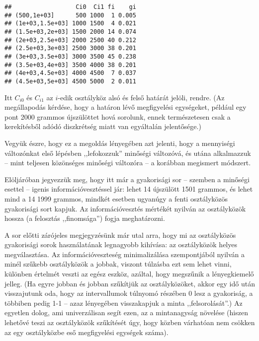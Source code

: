 \documentclass[]{book}
\newenvironment{Shaded}{\begin{snugshade}}{\end{snugshade}}
\newcommand{\DataTypeTok}[1]{\textcolor[rgb]{0.13,0.29,0.53}{#1}}
\newcommand{\DecValTok}[1]{\textcolor[rgb]{0.00,0.00,0.81}{#1}}
\newcommand{\KeywordTok}[1]{\textcolor[rgb]{0.13,0.29,0.53}{\textbf{#1}}}
\newcommand{\NormalTok}[1]{#1}
\newcommand{\OperatorTok}[1]{\textcolor[rgb]{0.81,0.36,0.00}{\textbf{#1}}}
\newcommand{\StringTok}[1]{\textcolor[rgb]{0.31,0.60,0.02}{#1}}
\begin{document}
\begin{Shaded}
\end{Shaded}

\begin{verbatim}
##                  Ci0  Ci1 fi    gi
## (500,1e+03]      500 1000  1 0.005
## (1e+03,1.5e+03] 1000 1500  4 0.021
## (1.5e+03,2e+03] 1500 2000 14 0.074
## (2e+03,2.5e+03] 2000 2500 40 0.212
## (2.5e+03,3e+03] 2500 3000 38 0.201
## (3e+03,3.5e+03] 3000 3500 45 0.238
## (3.5e+03,4e+03] 3500 4000 38 0.201
## (4e+03,4.5e+03] 4000 4500  7 0.037
## (4.5e+03,5e+03] 4500 5000  2 0.011
\end{verbatim}

Itt \(C_{i0}\) és \(C_{i1}\) az \(i\)-edik osztályköz alsó és felső határát jelöli, rendre. (Az megállapodás kérdése, hogy a határon lévő megfigyelési egységeket, például egy pont 2000 grammos újszülöttet hová sorolunk, ennek természetesen csak a kerekítésből adódó diszkrétség miatt van egyáltalán jelentősége.)

Vegyük észre, hogy ez a megoldás lényegében azt jelenti, hogy a mennyiségi változónkat első lépésben ,,lefokozzuk'' minőségi változóvá, és utána alkalmazzuk -- mint teljesen közönséges minőségi változóra -- a korábban megismert módszert.

Elöljáróban jegyezzük meg, hogy itt már a gyakorisági sor -- szemben a minőségi esettel -- igenis információvesztéssel jár: lehet 14 újszülött 1501 grammos, és lehet mind a 14 1999 grammos, mindkét esetben ugyanúgy a fenti osztályközös gyakorisági sort kapjuk. Az információvesztés mértékét nyilván az osztályközök hossza (a felosztás ,,finomsága'') fogja meghatározni.

A sor előtti zárójeles megjegyzésünk már utal arra, hogy mi az osztályközös gyakorisági sorok használatának legnagyobb kihívása: az osztályközök helyes megválasztása. Az információveszteség minimalizálása szempontjából nyilván a minél szűkebb osztályközök a jobbak, viszont túlzásba ezt sem lehet vinni, különben értelmét veszti az egész eszköz, azáltal, hogy megszűnik a lényegkiemelő jelleg. (Ha egyre jobban és jobban szűkítjük az osztályközöket, akkor egy idő után visszajutunk oda, hogy az intervallumok túlnyomó részében 0 lesz a gyakoriság, a többiben pedig 1-1 -- azaz lényegében visszakapjuk a minta ,,felsorolását''.) Az egyetlen dolog, ami univerzálisan segít ezen, az a mintanagyság növelése (hiszen lehetővé teszi az osztályközök szűkítését úgy, hogy közben várhatóan nem csökken az egy osztályközbe eső megfigyelési egységek száma).
\end{document}
